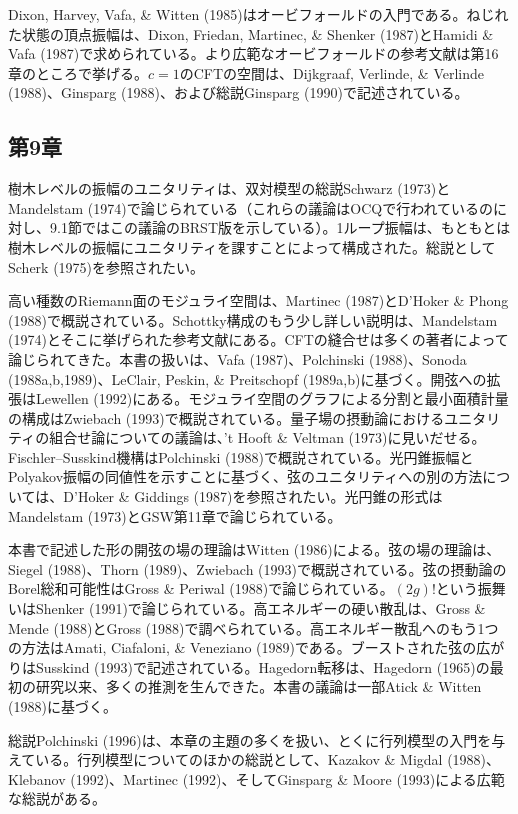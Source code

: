 Dixon, Harvey, Vafa, \& Witten (1985)はオービフォールドの入門である。ねじれた状態の頂点振幅は、Dixon, Friedan, Martinec, \& Shenker (1987)とHamidi \& Vafa (1987)で求められている。より広範なオービフォールドの参考文献は第16章のところで挙げる。$c=1$のCFTの空間は、Dijkgraaf, Verlinde, \& Verlinde (1988)、Ginsparg (1988)、および総説Ginsparg (1990)で記述されている。

\subsection*{第9章}
樹木レベルの振幅のユニタリティは、双対模型の総説Schwarz (1973)とMandelstam (1974)で論じられている（これらの議論はOCQで行われているのに対し、9.1節ではこの議論のBRST版を示している）。1ループ振幅は、もともとは樹木レベルの振幅にユニタリティを課すことによって構成された。総説としてScherk (1975)を参照されたい。

高い種数のRiemann面のモジュライ空間は、Martinec (1987)とD'Hoker \& Phong (1988)で概説されている。Schottky構成のもう少し詳しい説明は、Mandelstam (1974)とそこに挙げられた参考文献にある。CFTの縫合せは多くの著者によって論じられてきた。本書の扱いは、Vafa (1987)、Polchinski (1988)、Sonoda (1988a,b,1989)、LeClair, Peskin, \& Preitschopf (1989a,b)に基づく。開弦への拡張はLewellen (1992)にある。モジュライ空間のグラフによる分割と最小面積計量の構成はZwiebach (1993)で概説されている。量子場の摂動論におけるユニタリティの組合せ論についての議論は、't Hooft \& Veltman (1973)に見いだせる。Fischler--Susskind機構はPolchinski (1988)で概説されている。光円錐振幅とPolyakov振幅の同値性を示すことに基づく、弦のユニタリティへの別の方法については、D'Hoker \& Giddings (1987)を参照されたい。光円錐の形式はMandelstam (1973)とGSW第11章で論じられている。

本書で記述した形の開弦の場の理論はWitten (1986)による。弦の場の理論は、Siegel (1988)、Thorn (1989)、Zwiebach (1993)で概説されている。弦の摂動論のBorel総和可能性はGross \& Periwal (1988)で論じられている。$(2g)!$という振舞いはShenker (1991)で論じられている。高エネルギーの硬い散乱は、Gross \& Mende (1988)とGross (1988)で調べられている。高エネルギー散乱へのもう1つの方法はAmati, Ciafaloni, \& Veneziano (1989)である。ブーストされた弦の広がりはSusskind (1993)で記述されている。Hagedorn転移は、Hagedorn (1965)の最初の研究以来、多くの推測を生んできた。本書の議論は一部Atick \& Witten (1988)に基づく。

総説Polchinski (1996)は、本章の主題の多くを扱い、とくに行列模型の入門を与えている。行列模型についてのほかの総説として、Kazakov \& Migdal (1988)、Klebanov (1992)、Martinec (1992)、そしてGinsparg \& Moore (1993)による広範な総説がある。
